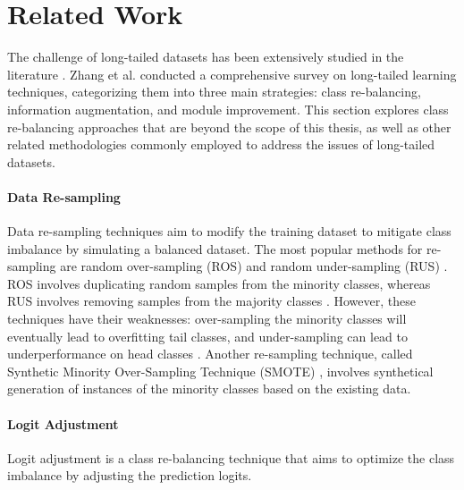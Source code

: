 


\section{Related Work}
The challenge of long-tailed datasets has been extensively studied in the literature \cite{zhang2023deep,zhang2024systematicreviewlongtailedlearning}. Zhang et al. \cite{zhang2023deep} conducted a comprehensive survey on long-tailed learning techniques, categorizing them into three main strategies: class re-balancing, information augmentation, and module improvement. This section explores class re-balancing approaches that are beyond the scope of this thesis, as well as other related methodologies commonly employed to address the issues of long-tailed datasets.

\paragraph{Data Re-sampling}
Data re-sampling techniques aim to modify the training dataset to mitigate class imbalance by simulating a balanced dataset. The most popular methods for re-sampling are random over-sampling (ROS) and random under-sampling (RUS) \cite{Chawla_2002,han2005}. ROS involves duplicating random samples from the minority classes, whereas RUS involves removing samples from the majority classes \cite{zhang2023deep,han2005}. However, these techniques have their weaknesses: over-sampling the minority classes will eventually lead to overfitting tail classes, and under-sampling can lead to underperformance on head classes \cite{zhang2023deep}. Another re-sampling technique, called Synthetic Minority Over-Sampling Technique (SMOTE) \cite{Chawla_2002}, involves synthetical generation of instances of the minority classes based on the existing data. 

\paragraph{Logit Adjustment}
Logit adjustment is a class re-balancing technique that aims to optimize the class imbalance by adjusting the prediction logits.

